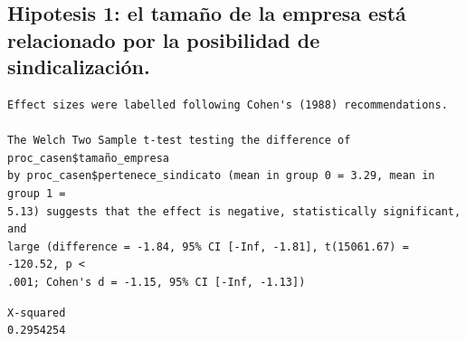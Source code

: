 \documentclass[
  a4paper,
  oneside]{scrbook}
\newenvironment{Shaded}{\begin{snugshade}}{\end{snugshade}}
\newcommand{\AttributeTok}[1]{\textcolor[rgb]{0.40,0.45,0.13}{#1}}
\newcommand{\DecValTok}[1]{\textcolor[rgb]{0.68,0.00,0.00}{#1}}
\newcommand{\FunctionTok}[1]{\textcolor[rgb]{0.28,0.35,0.67}{#1}}
\newcommand{\NormalTok}[1]{\textcolor[rgb]{0.00,0.23,0.31}{#1}}
\newcommand{\OtherTok}[1]{\textcolor[rgb]{0.00,0.23,0.31}{#1}}
\newcommand{\SpecialCharTok}[1]{\textcolor[rgb]{0.37,0.37,0.37}{#1}}
\newcommand{\StringTok}[1]{\textcolor[rgb]{0.13,0.47,0.30}{#1}}
\begin{document}
\subsection{Hipotesis 1: el tamaño de la empresa está relacionado por la
posibilidad de
sindicalización.}\label{hipotesis-1-el-tamauxf1o-de-la-empresa-estuxe1-relacionado-por-la-posibilidad-de-sindicalizaciuxf3n.}

\begin{Shaded}
\end{Shaded}

\begin{verbatim}
Effect sizes were labelled following Cohen's (1988) recommendations.

The Welch Two Sample t-test testing the difference of proc_casen$tamaño_empresa
by proc_casen$pertenece_sindicato (mean in group 0 = 3.29, mean in group 1 =
5.13) suggests that the effect is negative, statistically significant, and
large (difference = -1.84, 95% CI [-Inf, -1.81], t(15061.67) = -120.52, p <
.001; Cohen's d = -1.15, 95% CI [-Inf, -1.13])
\end{verbatim}

\begin{Shaded}
\end{Shaded}

\begin{verbatim}
X-squared 
0.2954254 
\end{verbatim}
\end{document}
